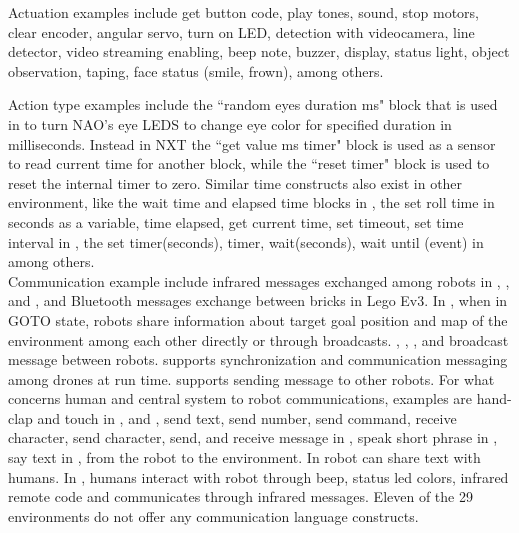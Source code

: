 Actuation examples include get button code, play tones, sound, stop motors, clear encoder, angular servo, turn on LED, detection with videocamera, line detector, video streaming enabling, beep note, buzzer, display, status light, object observation, taping, face status (smile, frown), among others. %
 
Action type examples include the ``random eyes duration ms" block that is used in \openroberta to turn NAO's eye LEDS to change eye color for specified duration in milliseconds. Instead in NXT the ``get value ms timer" block is used as a sensor to read current time for another block, while the ``reset timer" block is used to reset the internal timer to zero. Similar time constructs also exist in other environment, like the wait time and elapsed time blocks in \ardublockly, the set roll time in seconds as a variable, time elapsed, get current time, set timeout, set time interval in \sphero, the set timer(seconds), timer, wait(seconds), wait until (event) in \vex among others. \\

Communication example include infrared messages exchanged among robots in  \edison, \lego, and \openroberta, and Bluetooth messages exchange between bricks in Lego Ev3. In \missionlab, when in GOTO state, robots share information about target goal position and map of the environment among each other directly or through broadcasts. \sphero, \vex, \makeblock, and \tello broadcast message between robots. \flyaq supports synchronization and communication messaging among drones at run time.  \trik supports sending message to other robots. For what concerns human and central system to robot communications, examples are hand-clap and touch in \aseba, and \enchanting, send text, send number, send command, receive character, send character, send, and receive message in \tello, speak short phrase in \codelab, say text in \trik, \tivipe from the robot to the environment. In \choregraphe robot can share text with humans. In \arcbotics, humans interact with robot through beep, status led colors, infrared remote code and \picaxe communicates through infrared messages. Eleven of the 29 environments do not offer any communication language constructs. \\

